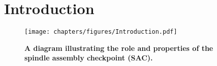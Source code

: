 \chapter{Introduction}
\label{chpt:introduction}



\begin{figure}
    \centering
    \texttt{[image: chapters/figures/Introduction.pdf]}
    \caption{\textbf{A diagram illustrating the role and properties of the spindle assembly checkpoint (SAC).}}
    \label{Introduction}
\end{figure}